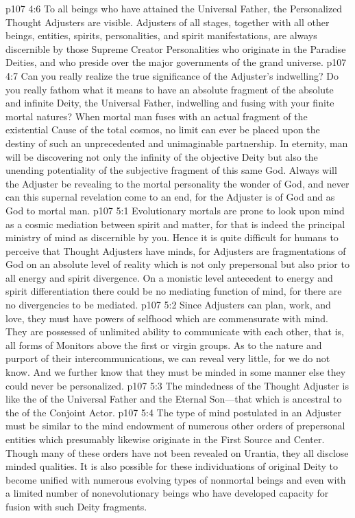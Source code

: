 \vs p107 4:6 To all beings who have attained the Universal Father, the Personalized Thought Adjusters are visible. Adjusters of all stages, together with all other beings, entities, spirits, personalities, and spirit manifestations, are always discernible by those Supreme Creator Personalities who originate in the Paradise Deities, and who preside over the major governments of the grand universe.
\pc \vs p107 4:7 Can you really realize the true significance of the Adjuster’s indwelling? Do you really fathom what it means to have an absolute fragment of the absolute and infinite Deity, the Universal Father, indwelling and fusing with your finite mortal natures? When mortal man fuses with an actual fragment of the existential Cause of the total cosmos, no limit can ever be placed upon the destiny of such an unprecedented and unimaginable partnership. In eternity, man will be discovering not only the infinity of the objective Deity but also the unending potentiality of the subjective fragment of this same God. Always will the Adjuster be revealing to the mortal personality the wonder of God, and never can this supernal revelation come to an end, for the Adjuster is of God and as God to mortal man.
\vs p107 5:1 Evolutionary mortals are prone to look upon mind as a cosmic mediation between spirit and matter, for that is indeed the principal ministry of mind as discernible by you. Hence it is quite difficult for humans to perceive that Thought Adjusters have minds, for Adjusters are fragmentations of God on an absolute level of reality which is not only prepersonal but also prior to all energy and spirit divergence. On a monistic level antecedent to energy and spirit differentiation there could be no mediating function of mind, for there are no divergencies to be mediated.\plusone
\vs p107 5:2 Since Adjusters can plan, work, and love, they must have powers of selfhood which are commensurate with mind. They are possessed of unlimited ability to communicate with each other, that is, all forms of Monitors above the first or virgin groups. As to the nature and purport of their intercommunications, we can reveal very little, for we do not know. And we further know that they must be minded in some manner else they could never be personalized.
\vs p107 5:3 The mindedness of the Thought Adjuster is like the  of the Universal Father and the Eternal Son---that which is ancestral to the  of the Conjoint Actor.
\vs p107 5:4 The type of mind postulated in an Adjuster must be similar to the mind endowment of numerous other orders of prepersonal entities which presumably likewise originate in the First Source and Center. Though many of these orders have not been revealed on Urantia, they all disclose minded qualities. It is also possible for these individuations of original Deity to become unified with numerous evolving types of nonmortal beings and even with a limited number of nonevolutionary beings who have developed capacity for fusion with such Deity fragments.
